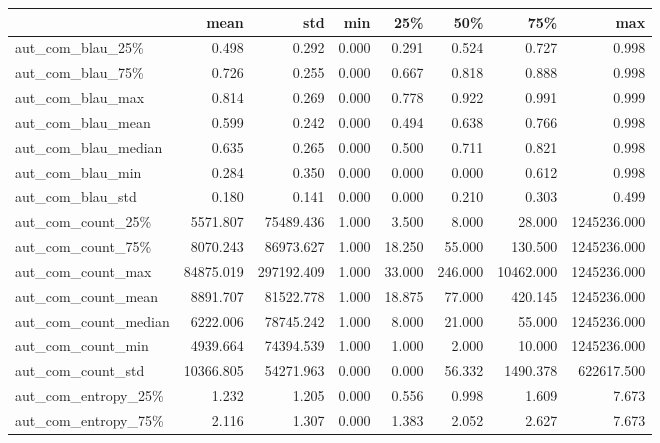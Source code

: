 \begin{table}
\centering
\begin{tabular}{lrrrrrrr}
\toprule
{} &      mean &        std &   min &    25\% &     50\% &       75\% &         max \\
\midrule
aut\_com\_blau\_25\%       &     0.498 &      0.292 & 0.000 &  0.291 &   0.524 &     0.727 &       0.998 \\
aut\_com\_blau\_75\%       &     0.726 &      0.255 & 0.000 &  0.667 &   0.818 &     0.888 &       0.998 \\
aut\_com\_blau\_max       &     0.814 &      0.269 & 0.000 &  0.778 &   0.922 &     0.991 &       0.999 \\
aut\_com\_blau\_mean      &     0.599 &      0.242 & 0.000 &  0.494 &   0.638 &     0.766 &       0.998 \\
aut\_com\_blau\_median    &     0.635 &      0.265 & 0.000 &  0.500 &   0.711 &     0.821 &       0.998 \\
aut\_com\_blau\_min       &     0.284 &      0.350 & 0.000 &  0.000 &   0.000 &     0.612 &       0.998 \\
aut\_com\_blau\_std       &     0.180 &      0.141 & 0.000 &  0.000 &   0.210 &     0.303 &       0.499 \\
aut\_com\_count\_25\%      &  5571.807 &  75489.436 & 1.000 &  3.500 &   8.000 &    28.000 & 1245236.000 \\
aut\_com\_count\_75\%      &  8070.243 &  86973.627 & 1.000 & 18.250 &  55.000 &   130.500 & 1245236.000 \\
aut\_com\_count\_max      & 84875.019 & 297192.409 & 1.000 & 33.000 & 246.000 & 10462.000 & 1245236.000 \\
aut\_com\_count\_mean     &  8891.707 &  81522.778 & 1.000 & 18.875 &  77.000 &   420.145 & 1245236.000 \\
aut\_com\_count\_median   &  6222.006 &  78745.242 & 1.000 &  8.000 &  21.000 &    55.000 & 1245236.000 \\
aut\_com\_count\_min      &  4939.664 &  74394.539 & 1.000 &  1.000 &   2.000 &    10.000 & 1245236.000 \\
aut\_com\_count\_std      & 10366.805 &  54271.963 & 0.000 &  0.000 &  56.332 &  1490.378 &  622617.500 \\
aut\_com\_entropy\_25\%    &     1.232 &      1.205 & 0.000 &  0.556 &   0.998 &     1.609 &       7.673 \\
aut\_com\_entropy\_75\%    &     2.116 &      1.307 & 0.000 &  1.383 &   2.052 &     2.627 &       7.673 \\

\end{tabular}
\end{table}
